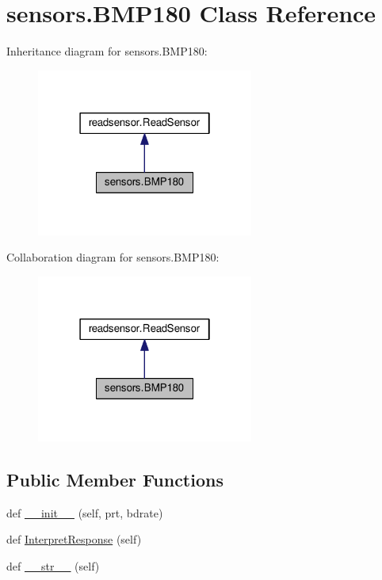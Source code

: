 \hypertarget{classsensors_1_1BMP180}{}\section{sensors.\+B\+M\+P180 Class Reference}
\label{classsensors_1_1BMP180}


Inheritance diagram for sensors.\+B\+M\+P180\+:\nopagebreak
\begin{figure}[H]
\begin{center}
\leavevmode
\includegraphics[width=202pt]{classsensors_1_1BMP180__inherit__graph}
\end{center}
\end{figure}


Collaboration diagram for sensors.\+B\+M\+P180\+:\nopagebreak
\begin{figure}[H]
\begin{center}
\leavevmode
\includegraphics[width=202pt]{classsensors_1_1BMP180__coll__graph}
\end{center}
\end{figure}
\subsection*{Public Member Functions}
\begin{DoxyCompactItemize}
\item 
def \hyperlink{classsensors_1_1BMP180_a4818f2b88b0969dc27a026b901564035}{\+\_\+\+\_\+init\+\_\+\+\_\+} (self, prt, bdrate)
\item 
def \hyperlink{classsensors_1_1BMP180_ad249a90be7cff513ac5a9851a9968403}{Interpret\+Response} (self)
\item 
def \hyperlink{classsensors_1_1BMP180_a5f5a28a84b1e4aac10f9ce814730c9b4}{\+\_\+\+\_\+str\+\_\+\+\_\+} (self)
\end{DoxyCompactItemize}
